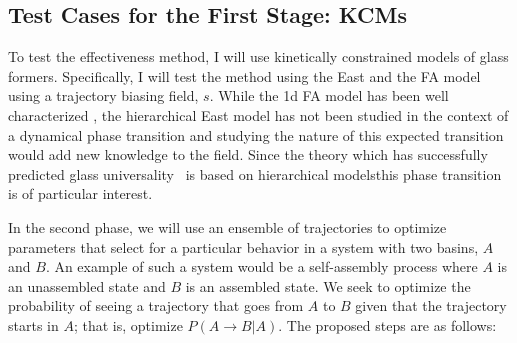 \documentclass[11pt]{article}
\begin{document}
\subsection*{Test Cases for the First Stage: KCMs}
To test the effectiveness method,  I will use kinetically constrained models of glass formers.  Specifically, I will test the method using the East \cite{Ritort_AdvInPhys_2003} and the FA model using a trajectory biasing field, $s$.  While the 1d FA model has been well characterized \cite{Garrahan_JPhysA_2008, Elmatad_PNAS_2010}, the hierarchical East model has not been studied in the context of a dynamical phase transition and studying the nature of this expected transition would add new knowledge to the field.  Since the theory \cite{Garrahan2003} which has successfully predicted glass universality~\cite{Elmatad2009} is based on hierarchical modelsthis phase transition is of particular interest. 



In the second phase, we will use an ensemble of trajectories to optimize parameters that select for a particular behavior in a system with two basins, $A$ and $B$.  An example of such a system would be a self-assembly process where $A$ is an unassembled state and $B$ is an assembled state.  We seek to optimize the probability of seeing a trajectory that goes from $A$ to $B$ given that the trajectory starts in $A$; that is, optimize $P(A\rightarrow B | A)$.  The proposed steps are as follows: 
\end{document}
